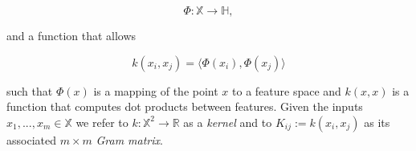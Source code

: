 \begin{equation}
\Phi \colon \mathbb{X} \rightarrow \mathbb{H},
\end{equation} 

\noindent and a function that allows

\begin{equation}
k(x_i, x_j) = \langle \Phi(x_i), \Phi(x_j) \rangle
\end{equation} 

\noindent such that $\Phi(x)$ is a mapping of the point $x$ to a feature space and $k(x, x)$ is a function that computes dot products between features. Given the inputs $x_1, ..., x_m \in \mathbb{X}$ we refer to $k \colon \mathbb{X}^2 \rightarrow \mathbb{R}$ as a \textit{kernel} and to $K_{ij} := k(x_i, x_j)$ as its associated $m \times m$ \textit{Gram matrix}.





